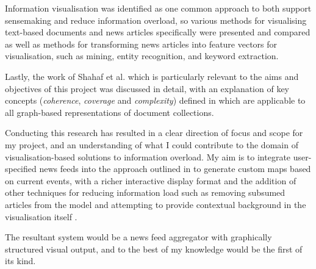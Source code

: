 Information visualisation was identified as one common approach to both support sensemaking and reduce information overload, so various methods for visualising text-based documents and news articles specifically were presented and compared \citep{ESTHETE, ThemeRiver, InteractiveTopicBasedVisualTextSummarizationAndAnalysis, ExploringLongRunningNewsStoriesUsingWikipedia, Nreader} as well as methods for transforming news articles into feature vectors for visualisation, such as mining, entity recognition, and keyword extraction.

Lastly, the work of Shahaf et al. \citep{ConnectingTheDots, GeneratingInformationMaps, MetroMapsOfScience, InformationCartographyPre} which is particularly relevant to the aims and objectives of this project was discussed in detail, with an explanation of key concepts (\textit{coherence}, \textit{coverage} and \textit{complexity}) defined in \citep{GeneratingInformationMaps} which are applicable to all graph-based representations of document collections.

Conducting this research has resulted in a clear direction of focus and scope for my project, and an understanding of what I could contribute to the domain of visualisation-based solutions to information overload. My aim is to integrate user-specified news feeds into the approach outlined in \citep{GeneratingInformationMaps} to generate custom maps based on current events, with a richer interactive display format and the addition of other techniques for reducing information load such as removing subsumed articles from the model \citep{UtilizingPhraseSimilarityMeasures} and attempting to provide contextual background in the visualisation itself \citep{ExploringLongRunningNewsStoriesUsingWikipedia}.

The resultant system would be a news feed aggregator with graphically structured visual output, and to the best of my knowledge would be the first of its kind.  
